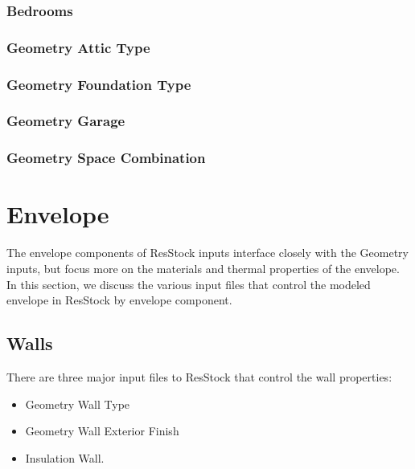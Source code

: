 \subsubsection{Bedrooms}


\subsubsection{Geometry Attic Type}


\subsubsection{Geometry Foundation Type} \label{geometry_foundation_type}


\subsubsection{Geometry Garage}


\subsubsection{Geometry Space Combination}


\section{Envelope}

The envelope components of ResStock inputs interface closely with the Geometry inputs, but focus more on the materials and thermal properties of the envelope. In this section, we discuss the various input files that control the modeled envelope in ResStock by envelope component.

\subsection{Walls}

There are three major input files to ResStock that control the wall properties:
\begin{itemize}
    \item Geometry Wall Type
    \item Geometry Wall Exterior Finish
    \item Insulation Wall.
\end{itemize}

